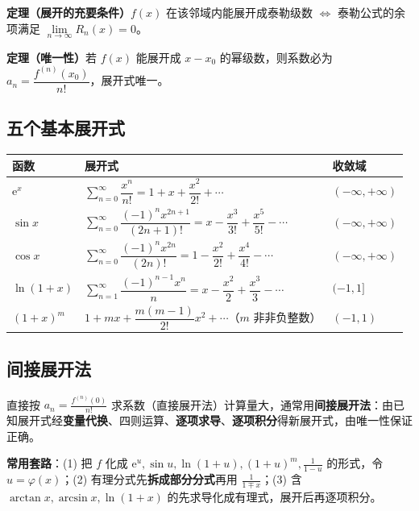 \textbf{定理（展开的充要条件）}\quad $f(x)$ 在该邻域内能展开成泰勒级数 $\iff$ 泰勒公式的余项满足 $\lim\limits_{n\to\infty}R_n(x)=0$。

\textbf{定理（唯一性）}\quad 若 $f(x)$ 能展开成 $x-x_0$ 的幂级数，则系数必为 $a_n=\dfrac{f^{(n)}(x_0)}{n!}$，展开式唯一。

\subsection{五个基本展开式}

\begin{center}
\begin{tabular}{@{}lll@{}}
\toprule
函数 & 展开式 & 收敛域 \\
\midrule
$\mathrm{e}^{x}$ & $\sum\limits_{n=0}^{\infty}\dfrac{x^{n}}{n!}=1+x+\dfrac{x^{2}}{2!}+\cdots$ & $(-\infty,+\infty)$ \\
$\sin x$ & $\sum\limits_{n=0}^{\infty}\dfrac{(-1)^{n}x^{2n+1}}{(2n+1)!}=x-\dfrac{x^{3}}{3!}+\dfrac{x^{5}}{5!}-\cdots$ & $(-\infty,+\infty)$ \\
$\cos x$ & $\sum\limits_{n=0}^{\infty}\dfrac{(-1)^{n}x^{2n}}{(2n)!}=1-\dfrac{x^{2}}{2!}+\dfrac{x^{4}}{4!}-\cdots$ & $(-\infty,+\infty)$ \\
$\ln(1+x)$ & $\sum\limits_{n=1}^{\infty}\dfrac{(-1)^{n-1}x^{n}}{n}=x-\dfrac{x^{2}}{2}+\dfrac{x^{3}}{3}-\cdots$ & $(-1,1]$ \\
$(1+x)^{m}$ & $1+mx+\dfrac{m(m-1)}{2!}x^{2}+\cdots$（$m$ 非非负整数） & $(-1,1)$ \\
\bottomrule
\end{tabular}
\end{center}


\subsection{间接展开法}

直接按 $a_n=\frac{f^{(n)}(0)}{n!}$ 求系数（直接展开法）计算量大，通常用\textbf{间接展开法}：由已知展开式经\textbf{变量代换}、四则运算、\textbf{逐项求导}、\textbf{逐项积分}得新展开式，由唯一性保证正确。

\textbf{常用套路}：(1) 把 $f$ 化成 $\mathrm{e}^{u},\sin u,\ln(1+u),(1+u)^m,\frac{1}{1-u}$ 的形式，令 $u=\varphi(x)$；(2) 有理分式先\textbf{拆成部分分式}再用 $\frac{1}{1\mp x}$；(3) 含 $\arctan x,\arcsin x,\ln(1+x)$ 的先求导化成有理式，展开后再逐项积分。

